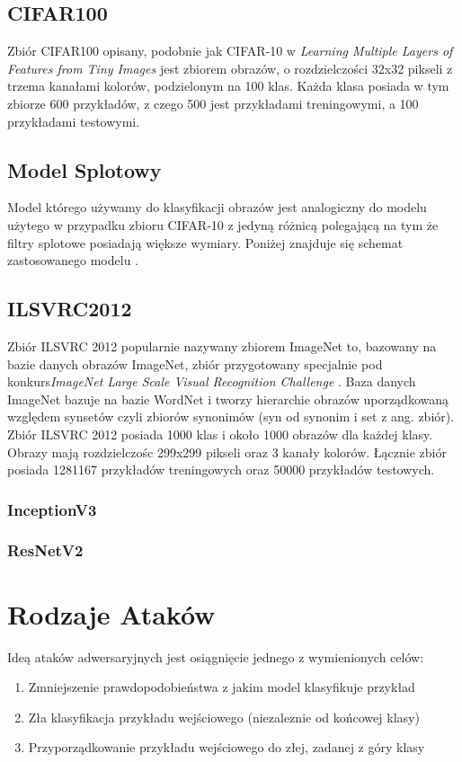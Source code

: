 \documentclass{article}
\begin{document}
    \subsection{CIFAR100}
    Zbiór CIFAR100 opisany, podobnie jak CIFAR-10 w  \textit{Learning Multiple Layers of Features from Tiny Images} \cite{Krizhevsky2009LearningML}
    jest zbiorem obrazów, o rozdzielczości 32x32 pikseli z trzema kanałami kolorów, podzielonym na 100 klas.
    Każda klasa posiada w tym zbiorze 600 przykładów, z czego 500 jest przykładami treningowymi, a 100 przykładami testowymi.
        \subsection{Model Splotowy}
        Model którego używamy do klasyfikacji obrazów jest analogiczny do modelu użytego w przypadku zbioru CIFAR-10 z jedyną różnicą polegającą na
        tym że filtry splotowe posiadają większe wymiary. Poniżej znajduje się schemat zastosowanego modelu .

    \subsection{ILSVRC2012}
        Zbiór ILSVRC 2012 popularnie nazywany zbiorem ImageNet to, bazowany na bazie danych obrazów ImageNet, zbiór
        przygotowany specjalnie pod konkurs\textit{ImageNet Large Scale Visual Recognition Challenge} \cite{ILSVRC15}.
        Baza danych ImageNet bazuje na bazie WordNet i tworzy hierarchie obrazów uporządkowaną względem synsetów
        czyli zbiorów synonimów (syn od synonim i set z ang. zbiór). Zbiór ILSVRC 2012 posiada 1000 klas i około 1000
        obrazów dla każdej klasy. Obrazy mają rozdzielczośc 299x299 pikseli oraz 3 kanały kolorów. Łącznie zbiór posiada
        1281167 przykładów treningowych oraz 50000 przykładów testowych.

        \subsubsection{InceptionV3}
        \subsubsection{ResNetV2}




\section{Rodzaje Ataków}
Ideą ataków adwersaryjnych  jest osiągnięcie jednego z wymienionych celów:
\begin{enumerate}
    \item Zmniejszenie prawdopodobieństwa z jakim model klasyfikuje przykład
    \item Zła klasyfikacja przykładu wejściowego (niezaleznie od końcowej klasy)
    \item Przyporządkowanie przykładu wejściowego do złej, zadanej z góry klasy
\end{enumerate}
\end{document}
